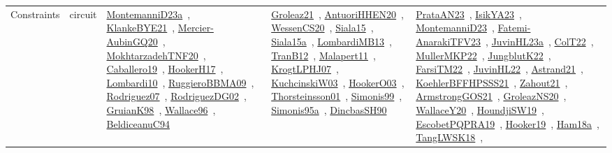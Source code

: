 {\begin{longtable}{lp{3cm}>{\raggedright\arraybackslash}p{6cm}>{\raggedright\arraybackslash}p{6cm}>{\raggedright\arraybackslash}p{8cm}}
Constraints & circuit & \href{../works/MontemanniD23a.pdf}{MontemanniD23a}~\cite{MontemanniD23a}, \href{../works/KlankeBYE21.pdf}{KlankeBYE21}~\cite{KlankeBYE21}, \href{../works/Mercier-AubinGQ20.pdf}{Mercier-AubinGQ20}~\cite{Mercier-AubinGQ20}, \href{../works/MokhtarzadehTNF20.pdf}{MokhtarzadehTNF20}~\cite{MokhtarzadehTNF20}, \href{../works/Caballero19.pdf}{Caballero19}~\cite{Caballero19}, \href{../works/HookerH17.pdf}{HookerH17}~\cite{HookerH17}, \href{../works/Lombardi10.pdf}{Lombardi10}~\cite{Lombardi10}, \href{../works/RuggieroBBMA09.pdf}{RuggieroBBMA09}~\cite{RuggieroBBMA09}, \href{../works/Rodriguez07.pdf}{Rodriguez07}~\cite{Rodriguez07}, \href{../works/RodriguezDG02.pdf}{RodriguezDG02}~\cite{RodriguezDG02}, \href{../works/GruianK98.pdf}{GruianK98}~\cite{GruianK98}, \href{../works/Wallace96.pdf}{Wallace96}~\cite{Wallace96}, \href{../works/BeldiceanuC94.pdf}{BeldiceanuC94}~\cite{BeldiceanuC94} & \href{../works/Groleaz21.pdf}{Groleaz21}~\cite{Groleaz21}, \href{../works/AntuoriHHEN20.pdf}{AntuoriHHEN20}~\cite{AntuoriHHEN20}, \href{../works/WessenCS20.pdf}{WessenCS20}~\cite{WessenCS20}, \href{../works/Siala15.pdf}{Siala15}~\cite{Siala15}, \href{../works/Siala15a.pdf}{Siala15a}~\cite{Siala15a}, \href{../works/LombardiMB13.pdf}{LombardiMB13}~\cite{LombardiMB13}, \href{../works/TranB12.pdf}{TranB12}~\cite{TranB12}, \href{../works/Malapert11.pdf}{Malapert11}~\cite{Malapert11}, \href{../works/KrogtLPHJ07.pdf}{KrogtLPHJ07}~\cite{KrogtLPHJ07}, \href{../works/KuchcinskiW03.pdf}{KuchcinskiW03}~\cite{KuchcinskiW03}, \href{../works/HookerO03.pdf}{HookerO03}~\cite{HookerO03}, \href{../works/Thorsteinsson01.pdf}{Thorsteinsson01}~\cite{Thorsteinsson01}, \href{../works/Simonis99.pdf}{Simonis99}~\cite{Simonis99}, \href{../works/Simonis95a.pdf}{Simonis95a}~\cite{Simonis95a}, \href{../works/DincbasSH90.pdf}{DincbasSH90}~\cite{DincbasSH90} & \href{../works/PrataAN23.pdf}{PrataAN23}~\cite{PrataAN23}, \href{../works/IsikYA23.pdf}{IsikYA23}~\cite{IsikYA23}, \href{../works/MontemanniD23.pdf}{MontemanniD23}~\cite{MontemanniD23}, \href{../works/Fatemi-AnarakiTFV23.pdf}{Fatemi-AnarakiTFV23}~\cite{Fatemi-AnarakiTFV23}, \href{../works/JuvinHL23a.pdf}{JuvinHL23a}~\cite{JuvinHL23a}, \href{../works/ColT22.pdf}{ColT22}~\cite{ColT22}, \href{../works/MullerMKP22.pdf}{MullerMKP22}~\cite{MullerMKP22}, \href{../works/JungblutK22.pdf}{JungblutK22}~\cite{JungblutK22}, \href{../works/FarsiTM22.pdf}{FarsiTM22}~\cite{FarsiTM22}, \href{../works/JuvinHL22.pdf}{JuvinHL22}~\cite{JuvinHL22}, \href{../works/Astrand21.pdf}{Astrand21}~\cite{Astrand21}, \href{../works/KoehlerBFFHPSSS21.pdf}{KoehlerBFFHPSSS21}~\cite{KoehlerBFFHPSSS21}, \href{../works/Zahout21.pdf}{Zahout21}~\cite{Zahout21}, \href{../works/ArmstrongGOS21.pdf}{ArmstrongGOS21}~\cite{ArmstrongGOS21}, \href{../works/GroleazNS20.pdf}{GroleazNS20}~\cite{GroleazNS20}, \href{../works/WallaceY20.pdf}{WallaceY20}~\cite{WallaceY20}, \href{../works/HoundjiSW19.pdf}{HoundjiSW19}~\cite{HoundjiSW19}, \href{../works/EscobetPQPRA19.pdf}{EscobetPQPRA19}~\cite{EscobetPQPRA19}, \href{../works/Hooker19.pdf}{Hooker19}~\cite{Hooker19}, \href{../works/Ham18a.pdf}{Ham18a}~\cite{Ham18a}, \href{../works/TangLWSK18.pdf}{TangLWSK18}~\cite{TangLWSK18}, 
\end{longtable}}
